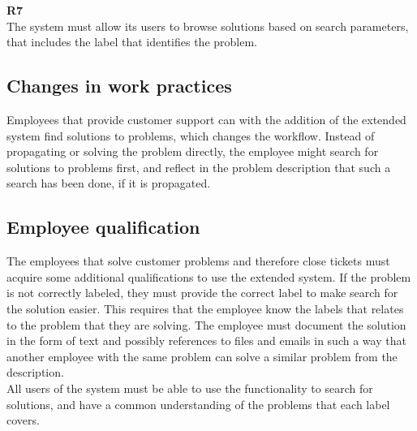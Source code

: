 \textbf{R7} \\
The system must allow its users to browse solutions based on search parameters, that includes the label that identifies the problem.

\subsection{Changes in work practices}
Employees that provide customer support can with the addition of the extended system find solutions to problems, which changes the workflow. Instead of propagating or solving the problem directly, the employee might search for solutions to problems first, and reflect in the problem description that such a search has been done, if it is propagated.

\subsection{Employee qualification}
The employees that solve customer problems and therefore close tickets must acquire some additional qualifications to use the extended system. If the problem is not correctly labeled, they must provide the correct label to make search for the solution easier. This requires that the employee know the labels that relates to the problem that they are solving. The employee must document the solution in the form of text and possibly references to files and emails in such a way that another employee with the same problem can solve a similar problem from the description.\\
All users of the system must be able to use the functionality to search for solutions, and have a common understanding of the problems that each label covers.

